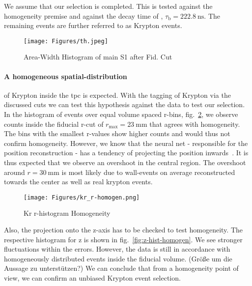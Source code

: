 We assume that our selection is completed.
This is tested against the homogeneity premise and against the decay time of , $\tau_\mathrm{b} = \SI{222.8}{\nano\s}$.
The remaining events are further referred to as Krypton events.


\begin{figure}
\centering
\texttt{[image: Figures/th.jpeg]}  %
\caption[Area-Width Histogram of main S1 after Fid. Cut]{
        Area-Width Histogram of main S1 after Fid. Cut
    }
\label{fig:main_s1_area_width}
\end{figure}


\paragraph{A homogeneous spatial-distribution} of Krypton inside the \gls{tpc} is expected.
With the tagging of Krypton via the discussed cuts we can test this hypothesis against the data to test our selection.
In the histogram of events over equal volume spaced r-bins, fig.~\ref{fig:r-hist-homogen}, we observe counts inside the fiducial r-cut of $r_\mathrm{max} = \SI{23}{\milli\m}$ that agrees with homogeneity.
The bins with the smallest r-values show higher counts and would thus not confirm homogeneity.
However, we know that the neural net - responsible for the position reconstruction - has a tendency of projecting the position inwards~\cite{ABism}.
It is thus expected that we observe an overshoot in the central region.
The overshoot around $ r = \SI{30}{\milli\m} $ is most likely due to wall-events on average reconstructed towards the center as well as real krypton events.

\begin{figure}
\centering
\texttt{[image: Figures/kr\_r-homogen.png]}  %
\caption[Kr r-histogram Homogeneity]{
        Kr r-histogram Homogeneity
    }
\label{fig:r-hist-homogen}
\end{figure}

Also, the projection onto the z-axis has to be checked to test homogeneity.
The respective histogram for z is shown in fig.~\ref{fig:z-hist-homogen}.
We see stronger fluctuations within the errors.
However, the data is still in accordance with homogeneously distributed events inside the fiducial volume.
(Größe um die Aussage zu unterstützen?)
We can conclude that from a homogeneity point of view, we can confirm an unbiased Krypton event selection.

